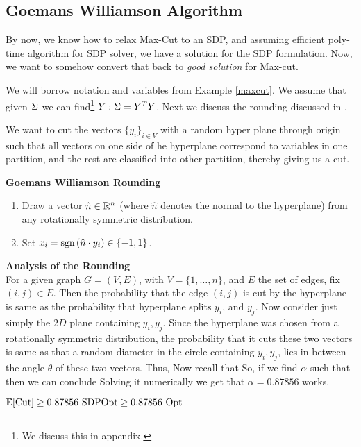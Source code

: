 \subsection{Goemans Williamson Algorithm}
By now, we know how to relax Max-Cut to an SDP, and assuming efficient poly-time algorithm for SDP solver, we have a solution for the SDP formulation. Now, we want to somehow convert that back to \textit{good solution} for Max-cut. 

We will borrow notation and variables from Example \ref{maxcut}.
We assume that given $\Sigma$ we can find\footnote{We discuss this in appendix.} $Y : \Sigma = Y^T Y$. 
Next we discuss the rounding discussed in \cite{gwFirstMaxCutSDP}. 

We want to cut the vectors $\{y_i\}_{i \in V}$ with a random hyper plane through origin such that all vectors on one side of he hyperplane correspond to variables in one partition, and the rest are classified into other partition, thereby giving us a cut. 

\begin{algorithm}\textbf{Goemans Williamson Rounding}
\begin{enumerate}
\item Draw a vector $\hat{n} \in \mathbb{R}^n$ (where $\hat{n}$ denotes the normal to the hyperplane) from any rotationally symmetric distribution. 
\item Set $x_i = \mbox{sgn}\left(\hat{n} \cdot y_i\right) \in \{-1, 1 \}$.
\end{enumerate}
\end{algorithm}

{\bf Analysis of the Rounding} \\
For a given graph $G = (V, E)$, with $V =\{1, \ldots, n\}$, and $E$ the set of edges, fix $(i, j) \in E$. Then the probability that the edge $(i, j)$ is cut by the hyperplane is same as the probability that hyperplane splits $y_i$, and $y_j$. 
Now consider just simply the $2D$ plane containing $y_i, y_j$. Since the hyperplane was chosen from a rotationally symmetric distribution, the probability that it cuts these two vectors is same as that a random diameter in the circle containing $y_i, y_j$, lies in between the angle $\theta$ of these two vectors. Thus, 
Now recall that 
So, if we find $\alpha$ such that 
then we can conclude 
Solving it numerically we get that $\alpha = 0.87856$ works.
\begin{remark}
$\Ex[\mbox{Cut}]  \geq 0.87856 \mbox{\ SDPOpt} \geq 0.87856 \mbox{\ Opt }$
\end{remark} 
 
